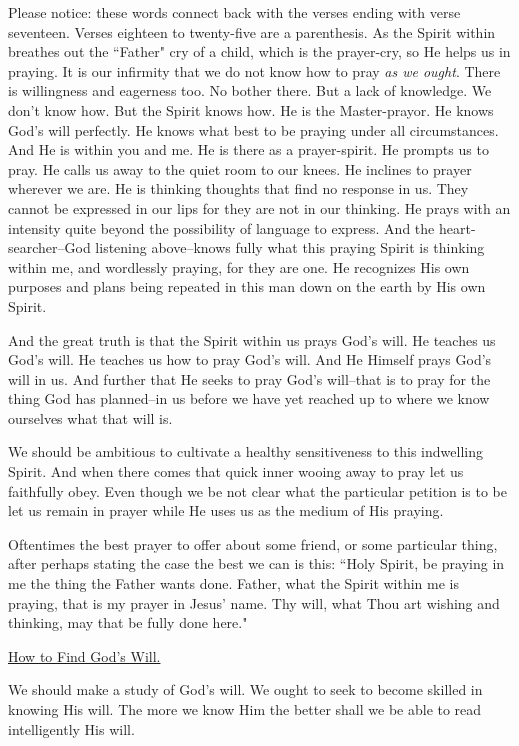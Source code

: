 Please notice: these words connect back with the verses ending with verse
seventeen. Verses eighteen to twenty-five are a parenthesis. As the Spirit
within breathes out the ``Father" cry of a child, which is the prayer-cry,
so He helps us in praying. It is our infirmity that we do not know how to
pray \textit{as we ought}. There is willingness and eagerness too. No bother
there. But a lack of knowledge. We don't know how. But the Spirit knows
how. He is the Master-prayor. He knows God's will perfectly. He knows what
best to be praying under all circumstances. And He is within you and me.
He is there as a prayer-spirit. He prompts us to pray. He calls us away to
the quiet room to our knees. He inclines to prayer wherever we are. He is
thinking thoughts that find no response in us. They cannot be expressed in
our lips for they are not in our thinking. He prays with an intensity
quite beyond the possibility of language to express. And the
heart-searcher--God listening above--knows fully what this praying Spirit
is thinking within me, and wordlessly praying, for they are one. He
recognizes His own purposes and plans being repeated in this man down on
the earth by His own Spirit.

And the great truth is that the Spirit within us prays God's will. He
teaches us God's will. He teaches us how to pray God's will. And He
Himself prays God's will in us. And further that He seeks to pray God's
will--that is to pray for the thing God has planned--in us before we have
yet reached up to where we know ourselves what that will is.

We should be ambitious to cultivate a healthy sensitiveness to this
indwelling Spirit. And when there comes that quick inner wooing away to
pray let us faithfully obey. Even though we be not clear what the
particular petition is to be let us remain in prayer while He uses us as
the medium of His praying.

Oftentimes the best prayer to offer about some friend, or some particular
thing, after perhaps stating the case the best we can is this: ``Holy
Spirit, be praying in me the thing the Father wants done. Father, what the
Spirit within me is praying, that is my prayer in Jesus' name. Thy will,
what Thou art wishing and thinking, may that be fully done here."



\underline{How to Find God's Will.}


We should make a study of God's will. We ought to seek to become skilled
in knowing His will. The more we know Him the better shall we be able to
read intelligently His will.

